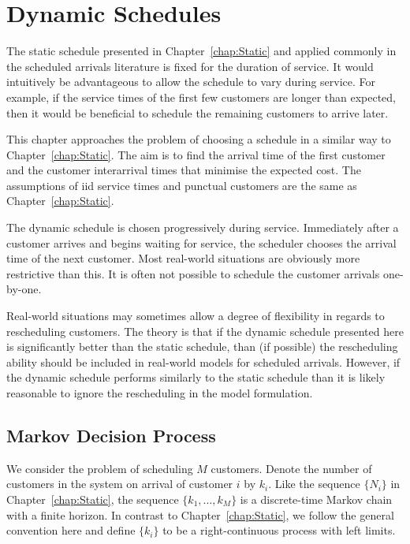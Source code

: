 \chapter{Dynamic Schedules}
\label{chap:Dynamic}
The static schedule presented in Chapter~\ref{chap:Static} and applied commonly in the scheduled arrivals literature is fixed for the duration of service. It would intuitively be advantageous to allow the schedule to vary during service. For example, if the service times of the first few customers are longer than expected, then it would be beneficial to schedule the remaining customers to arrive later.

This chapter approaches the problem of choosing a schedule in a similar way to Chapter~\ref{chap:Static}. The aim is to find the arrival time of the first customer and the customer interarrival times that minimise the expected cost. The assumptions of iid service times and punctual customers are the same as Chapter~\ref{chap:Static}.

The dynamic schedule is chosen progressively during service. Immediately after a customer arrives and begins waiting for service, the scheduler chooses the arrival time of the next customer. Most real-world situations are obviously more restrictive than this. It is often not possible to schedule the customer arrivals one-by-one.

Real-world situations may sometimes allow a degree of flexibility in regards to rescheduling customers. The theory is that if the dynamic schedule presented here is significantly better than the static schedule, than (if possible) the rescheduling ability should be included in real-world models for scheduled arrivals. However, if the dynamic schedule performs similarly to the static schedule than it is likely reasonable to ignore the rescheduling in the model formulation.

\section{Markov Decision Process}
We consider the problem of scheduling $M$ customers. Denote the number of customers in the system on arrival of customer $i$ by $k_{i}$. Like the sequence $\{ N_{i} \}$ in Chapter~\ref{chap:Static}, the sequence $\{ k_{1}, \ldots, k_{M} \}$ is a discrete-time Markov chain with a finite horizon. In contrast to Chapter~\ref{chap:Static}, we follow the general convention here and define $\{ k_{i} \}$ to be a right-continuous process with left limits.

